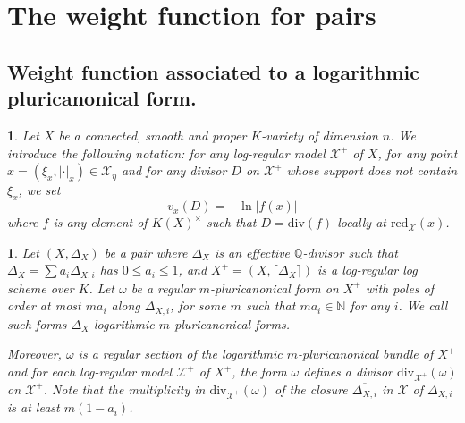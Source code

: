 \documentclass{amsart}%
\numberwithin{equation}{subsection}
\theoremstyle{plain2}
\theoremstyle{definition2}
\theoremstyle{stepstyle}
\theoremstyle{point}
\theoremstyle{subpoint}
\newtheorem{subpoint}[equation]{}%
\newcommand{\spa}[1]{\begin{subpoint}#1\end{subpoint}}           %
\newcommand{\N}{\ensuremath{\mathbb{N}}}
\newcommand{\Q}{\ensuremath{\mathbb{Q}}}
\newcommand{\cX}{\ensuremath{\mathscr{X}}}
\newcommand{\redu}{\mathrm{red}}
\newcommand{\divisor}{\mathrm{div}}
\begin{document}
\section{The weight function for pairs}
\subsection{Weight function associated to a logarithmic pluricanonical form.}
\spa{Let $X$ be a connected, smooth and proper $K$-variety of dimension $n$. We introduce the following notation: for any log-regular model $\cX^+$ of $X$, for any point $x = (\xi_x,|\cdot|_x) \in \widehat{\cX_{\eta}}$ and for any divisor $D$ on $\cX^+$ whose support does not contain $\xi_x$, we set $$v_x(D) = - \ln |f(x)|$$ where $f$ is any element of $K(X)^\times$ such that $D= \divisor(f)$ locally at $\redu_{\cX}(x)$.}

\spa{Let $(X,\Delta_X)$ be a pair where $\Delta_X$ is an effective $\Q$-divisor such that $\Delta_X= \sum a_i \Delta_{X,i}$ has $0 \leqslant a_i \leqslant 1$, and  $X^+=(X,\lceil \Delta_X \rceil)$ is a log-regular log scheme over $K$. Let $\omega$ be a regular $m$-pluricanonical form on $X^+$ with poles of order at most $ma_i$ along $\Delta_{X,i}$, for some $m$ such that $ma_i \in \N$ for any $i$. We call such forms $\Delta_X$-logarithmic $m$-pluricanonical forms.

Moreover, $\omega$ is a regular section of the logarithmic $m$-pluricanonical bundle of $X^+$ and for each log-regular model $\cX^+$ of $X^+$, the form $\omega$ defines a divisor $\divisor_{\cX^+}(\omega)$ on $\cX^+$. Note that the multiplicity in $\divisor_{\cX^+}(\omega)$ of the closure $\overline{\Delta_{X,i}}$ in $\cX$ of $\Delta_{X,i}$ is at least $m(1-a_i)$.
}
\end{document}
